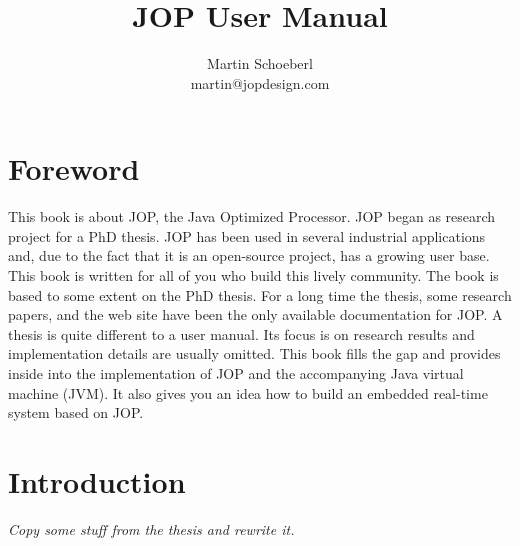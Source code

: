 







\title{JOP User Manual}
\author{Martin Schoeberl\\martin@jopdesign.com}
\maketitle \thispagestyle{empty}

%


%

\pagestyle{scrheadings} 

\tableofcontents \cleardoublepage
 \listoftables \newpage \listoffigures
 \newpage \lstlistoflistings \newpage

\chapter*{Foreword}

This book is about JOP, the Java Optimized Processor. JOP began as
research project for a PhD thesis. JOP has been used in several
industrial applications and, due to the fact that it is an
open-source project, has a growing user base. This book is written
for all of you who build this lively community. The book is based to
some extent on the PhD thesis. For a long time the thesis, some
research papers, and the web site  have been the only available
documentation for JOP. A thesis is quite different to a user manual.
Its focus is on research results and implementation details are
usually omitted. This book fills the gap and provides inside into
the implementation of JOP and the accompanying Java virtual machine
(JVM). It also gives you an idea how to build an embedded real-time
system based on JOP.


\pagestyle{scrheadings} 



\chapter{Introduction}
\label{chap:intro}

\emph{Copy some stuff from the thesis and rewrite it.}
    

